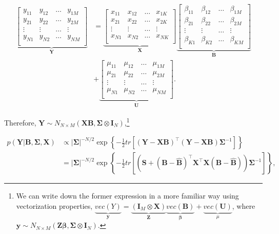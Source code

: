 \begin{align*}
	\underbrace{
		\begin{bmatrix}
			y_{11} & y_{12} & \dots & y_{1M}\\
			y_{21} & y_{22} & \dots & y_{2M}\\
			\vdots & \vdots & \dots & \vdots\\
			y_{N1} & y_{N2} & \dots & y_{NM}\\
	\end{bmatrix}}_{\bm{Y}}
	&=
	\underbrace{\begin{bmatrix}
			x_{11} & x_{12} & \dots & x_{1K}\\
			x_{21} & x_{22} & \dots & x_{2K}\\
			\vdots & \vdots & \dots & \vdots\\
			x_{N1} & x_{N2} & \dots & x_{NK}\\
	\end{bmatrix}}_{\bm{X}}
	\underbrace{
		\begin{bmatrix}
			\beta_{11} & \beta_{12} & \dots & \beta_{1M}\\
			\beta_{21} & \beta_{22} & \dots & \beta_{2M}\\
			\vdots & \vdots & \dots & \vdots\\
			\beta_{K1} & \beta_{K2} & \dots & \beta_{KM}\\
	\end{bmatrix}}_{\bm{B}}\\
	&+
	\underbrace{\begin{bmatrix}
			\mu_{11} & \mu_{12} & \dots & \mu_{1M}\\
			\mu_{21} & \mu_{22} & \dots & \mu_{2M}\\
			\vdots & \vdots & \dots & \vdots\\
			\mu_{N1} & \mu_{N2} & \dots & \mu_{NM}\\
	\end{bmatrix}}_{\bm{U}}.
\end{align*}

Therefore, ${\bm{Y}}\sim N_{N\times M}({\bm{X}}{\bm{B}},\bm{\Sigma}\otimes {\bm{I}}_N)$,\footnote{We can write down the former expression in a more familiar way using vectorization properties,
$\underbrace{vec(Y)}_{\bm{y}}=\underbrace{({\bm{I}}_M\otimes {\bm{X}})}_{{\bm{Z}}}\underbrace{vec({\bm{B}})}_{\bm{\beta}}+\underbrace{vec({\bm{U}})}_{\mu}$, where ${\bm{y}}\sim N_{N\times M}({\bm{Z}}\bm{\beta},\bm{\Sigma}\otimes {\bm{I}}_N)$.}

\begin{align*}
	p({\bm{Y}}| {\bm{B}},{\bm{\Sigma}}, {\bm{X}})&\propto |{{\bm \Sigma}}|^{-N/2}\exp\left\lbrace -\frac{1}{2}tr\left[({\bm{Y}}-{\bm{X}}{\bm{B}})^{\top}({\bm{Y}}-{\bm{X}}{\bm{B}}){{\bm \Sigma}}^{-1}\right]\right\rbrace
	\\
	&=|{{\bm \Sigma}}|^{-N/2}\exp\left\lbrace -\frac{1}{2}tr\left[\left({\bm{S}}+({\bm{B}}-\widehat{\bm{B}})^{\top}{\bm{X}}^{\top}{\bm{X}}({\bm{B}}-\widehat{\bm{B}})\right){{\bm \Sigma}}^{-1}\right]\right\rbrace,
\end{align*}

